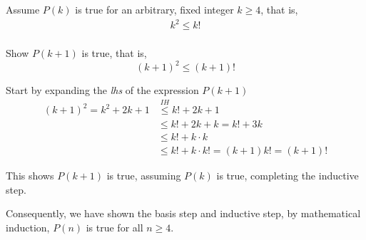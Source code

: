\documentclass[12pt,addpoints]{exam}
\begin{document}
\begin{questions}
\begin{solution}
Assume $P(k)$ is true for an arbitrary, fixed integer $k \geq 4$, that is,
\begin{align*}
	k^2 \leq k! \tag{IH} \\
\end{align*}

Show $P(k+1)$ is true, that is,
\[  (k+1)^2 \leq (k+1)! \]

Start by expanding the \textit{lhs} of the expression $P(k+1)$
\begin{align*}
	(k+1)^2 = k^2 + 2k + 1 &\overset{IH}{\leq} k! + 2k +1 \\
	 &\leq k! + 2k + k = k! + 3k  \tag{$k \geq 1$} \\
	 &\leq k! + k\cdot k \tag{$k \geq 3$} \\
	 &\leq k! + k\cdot k! = (k+1)k! = (k+1)! 
\end{align*}

This shows $P(k+1)$ is true, assuming $P(k)$ is true, completing the inductive step.

\smallskip
Consequently, we have shown the basis step and inductive step, by mathematical induction, $P(n)$ is true for all $n \geq 4$.
\end{solution}







\end{questions}
\end{document}
